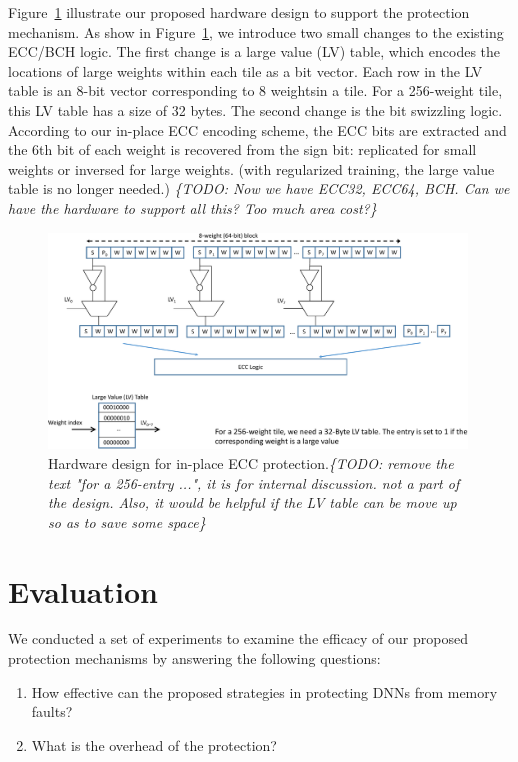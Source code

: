 \documentclass{article}
\newcommand{\TODO}[1]{{\it \color{blue}\{TODO: #1\}}}
\begin{document}
Figure~\ref{fig:hardware} illustrate our proposed hardware design to support the protection mechanism. As show in Figure~\ref{fig:hardware}, we introduce two small changes to the existing ECC/BCH logic. The first change is a large value (LV) table, which encodes the locations of large weights within each tile as a bit vector. Each row in the LV table is an 8-bit vector corresponding to 8 weightsin a tile. For a 256-weight tile, this LV table has a size of 32 bytes.  The second change is the bit swizzling logic. According to our in-place ECC encoding scheme, the ECC bits are extracted and the 6th bit of each weight is recovered from the sign bit: replicated for small weights or inversed for large weights. (with regularized training, the large value table is no longer needed.) \TODO{Now we have ECC32, ECC64, BCH. Can we have the hardware to support all this? Too much area cost?}

\begin{figure}
    \centering
    \includegraphics[width=0.99\textwidth]{NeuRIPS2019/images/hardware/DNN-ECC-crop.pdf}
    \caption{Hardware design for in-place ECC protection.\TODO{remove the text "for a 256-entry ...", it is for internal discussion. not a part of the design. Also, it would be helpful if the LV table can be move up so as to save some space}}
    \label{fig:hardware}
\end{figure}

  

\section{Evaluation}
We conducted a set of experiments to examine the efficacy of our proposed protection mechanisms by answering the following questions:
\begin{enumerate}
    \item How effective can the proposed strategies in protecting DNNs from memory faults?
    \item What is the overhead of the protection? 
\end{enumerate}
\end{document}
